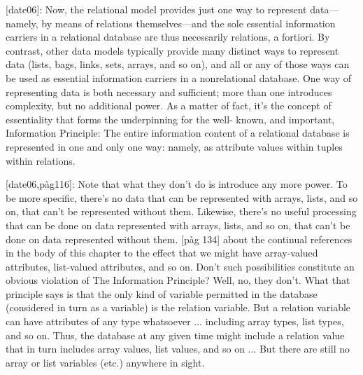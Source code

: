 [date06]:
                                                Now, the relational model provides just one way to
represent data—namely, by means of relations themselves—and the sole essential information
carriers in a relational database are thus necessarily relations, a fortiori. By contrast, other data
models typically provide many distinct ways to represent data (lists, bags, links, sets, arrays,
and so on), and all or any of those ways can be used as essential information carriers in a
nonrelational database. One way of representing data is both necessary and sufficient; more
than one introduces complexity, but no additional power.
     As a matter of fact, it’s the concept of essentiality that forms the underpinning for the well-
known, and important, Information Principle:
     The entire information content of a relational database is represented in one and only
     one way: namely, as attribute values within tuples within relations.

[date06,pàg116]:
Note that what they don’t do is introduce any more power. To be more specific, there’s no data that can
be represented with arrays, lists, and so on, that can’t be represented without them. Likewise, there’s no
useful processing that can be done on data represented with arrays, lists, and so on, that can’t be done
on data represented without them.
[pàg 134]
about the continual references in the body of this chapter to the effect that we might have
array-valued attributes, list-valued attributes, and so on. Don’t such possibilities constitute an
obvious violation of The Information Principle?
     Well, no, they don’t. What that principle says is that the only kind of variable permitted in
the database (considered in turn as a variable) is the relation variable. But a relation variable
can have attributes of any type whatsoever ... including array types, list types, and so on.
Thus, the database at any given time might include a relation value that in turn includes array
values, list values, and so on ... But there are still no array or list variables (etc.) anywhere in sight.




















